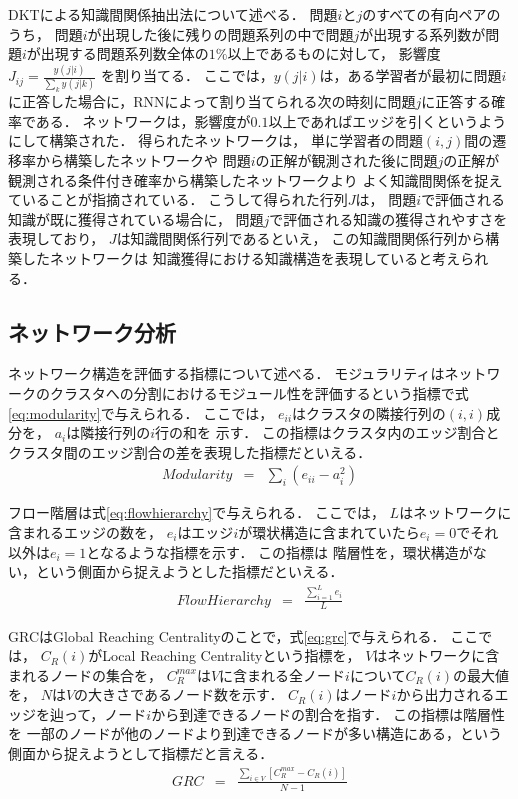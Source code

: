 \documentclass[twocolumn,a4j,10pt]{jsarticle}
\begin{document}
DKTによる知識間関係抽出法について述べる．
問題$i$と$j$のすべての有向ペアのうち，
問題$i$が出現した後に残りの問題系列の中で問題$j$が出現する系列数が問題$i$が出現する問題系列数全体の$1\%$以上であるものに対して，
影響度
$J_{ij} = \frac{y(j|i)}{\sum_k y(j|k)}$
を割り当てる．
ここでは，$y(j|i)$は，ある学習者が最初に問題$i$に正答した場合に，RNNによって割り当てられる次の時刻に問題$j$に正答する確率である．
ネットワークは，影響度が$0.1$以上であればエッジを引くというようにして構築された．
得られたネットワークは，
単に学習者の問題$(i, j)$間の遷移率から構築したネットワークや
問題$i$の正解が観測された後に問題$j$の正解が観測される条件付き確率から構築したネットワークより
よく知識間関係を捉えていることが指摘されている．
こうして得られた行列$J$は，
問題$i$で評価される知識が既に獲得されている場合に，
問題$j$で評価される知識の獲得されやすさを表現しており，
$J$は知識間関係行列であるといえ，
この知識間関係行列から構築したネットワークは
知識獲得における知識構造を表現していると考えられる．





\subsection{ネットワーク分析}
ネットワーク構造を評価する指標について述べる．
モジュラリティ\cite{newman2006modularity}はネットワークのクラスタへの分割におけるモジュール性を評価するという指標で式\ref{eq:modularity}で与えられる．
ここでは，
$e_{ii}$はクラスタの隣接行列の$(i, i)$成分を，
$a_i$は隣接行列の$i$行の和を
示す．
この指標はクラスタ内のエッジ割合とクラスタ間のエッジ割合の差を表現した指標だといえる．
\begin{eqnarray}
	\label{eq:modularity}
	Modularity &=& \sum_i(e_{ii} −a^2_i)
\end{eqnarray}

フロー階層\cite{luo2011detecting}は式\ref{eq:flowhierarchy}で与えられる．
ここでは，
$L$はネットワークに含まれるエッジの数を，
$e_{i}$はエッジ$i$が環状構造に含まれていたら$e_{i}=0$でそれ以外は$e_{i}=1$となるような指標を示す．
この指標は
階層性を，環状構造がない，という側面から捉えようとした指標だといえる．
\begin{eqnarray}
	\label{eq:flowhierarchy}
	FlowHierarchy &=& \frac{\sum^L_{i=1}e_{i}}{L} 
\end{eqnarray}


GRC\cite{mones2012hierarchy}はGlobal Reaching Centralityのことで，式\ref{eq:grc}で与えられる．
ここでは，
$C_R(i)$がLocal Reaching Centralityという指標を，
$V$はネットワークに含まれるノードの集合を，
$C_R^{max}$は$V$に含まれる全ノード$i$について$C_R(i)$の最大値を，
$N$は$V$の大きさであるノード数を示す．
$C_R(i)$はノード$i$から出力されるエッジを辿って，ノード$i$から到達できるノードの割合を指す．
この指標は階層性を
一部のノードが他のノードより到達できるノードが多い構造にある，という側面から捉えようとして指標だと言える．
\begin{eqnarray}
	\label{eq:grc}
	GRC &=& \frac{\sum_{i\in V}[C^{max}_R - C_R(i)]}{N-1}
\end{eqnarray}
\end{document}
